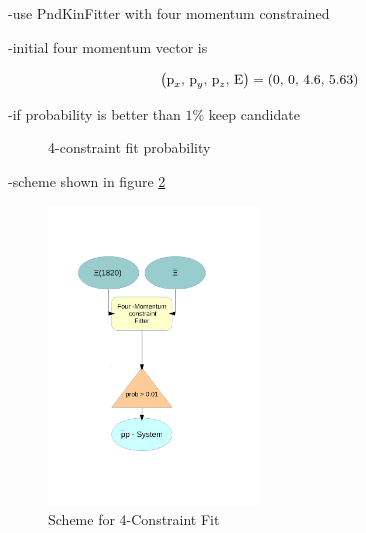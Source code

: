 	-use PndKinFitter with four momentum constrained
	
	-initial four momentum vector is 
	\begin{center}
		\begin{equation}\nonumber
			\left(\textnormal{p}_x,\, \textnormal{p}_y,\, \textnormal{p}_z,\, \textnormal{E} \right) = \left(0,\, 0,\, 4.6,\, 5.63 \right)
		\end{equation}
	\end{center}
	
	
	-if probability is better than $1\%$ keep candidate
	
	\begin{figure}
		\centering
		\caption{4-constraint fit probability}
		\label{fig:xisys_prob}
	\end{figure}
	
	-scheme shown in figure \ref{fig:fourconstraintfit}
	
	\begin{figure}
		\centering
			\includegraphics[width=0.50\textwidth]{./plots/combineCascadeSys.pdf}
		\caption{Scheme for 4-Constraint Fit}
		\label{fig:fourconstraintfit}
	\end{figure}